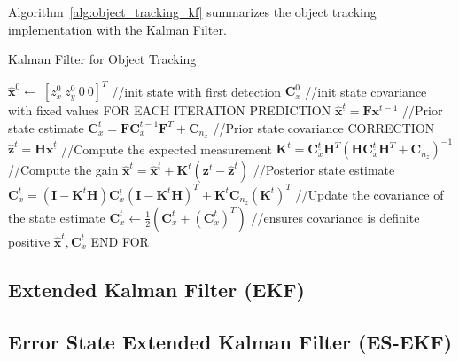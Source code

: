 Algorithm~\ref{alg:object_tracking_kf} summarizes the object tracking implementation with the Kalman Filter.
\begin{algorithm}
\caption{Kalman Filter for Object Tracking}
\begin{algorithmic}
\STATE $\hat{\mathbf{x}}^0 \leftarrow\ [z^0_x\ z^0_y\ 0\ 0]^T$ //init state with first detection
\STATE$\mathbf{C}^0_x$ //init state covariance with fixed values 
\STATE FOR EACH ITERATION
\STATE \hspace{0.5cm} PREDICTION
\STATE \hspace{1cm} $\hat{\mathbf{x}}^{\underline{t}} = \mathbf{F}\mathbf{x}^{t-1}$ //Prior state estimate
\STATE \hspace{1cm} $\mathbf{C}^{\underline{t}}_x = \mathbf{F}\mathbf{C}^{t-1}_x\mathbf{F}^T + \mathbf{C}_{n_x}$ //Prior state covariance
\STATE \hspace{0.5cm} CORRECTION
\STATE \hspace{1cm} $\hat{\mathbf{z}}^t = \mathbf{H}\hat{\mathbf{x}}^{\underline{t}}$ //Compute the expected measurement 
\STATE \hspace{1cm} $\mathbf{K}^t = \mathbf{C}^{\underline{t}}_x\mathbf{H}^T(\mathbf{H}\mathbf{C}^{\underline{t}}_x\mathbf{H}^T+\mathbf{C}_{n_z})^{-1}$ 
//Compute the gain
\STATE \hspace{1cm} $\hat{\mathbf{x}}^t = \hat{\mathbf{x}}^{\underline{t}} + \mathbf{K}^t(\mathbf{z}^t - \hat{\mathbf{z}}^t)$ //Posterior state estimate
\STATE \hspace{1cm} $\mathbf{C}^t_{x} = (\mathbf{I}-\mathbf{K}^t\mathbf{H})\mathbf{C}^{\underline{t}}_x(\mathbf{I}-\mathbf{K}^t\mathbf{H})^T
		    + \mathbf{K}^t\mathbf{C}_{n_z}(\mathbf{K}^t)^T$ //Update the covariance of the state estimate
\STATE \hspace{1cm} $\mathbf{C}^t_{x} \leftarrow \frac{1}{2}(\mathbf{C}^t_{x}+(\mathbf{C}^t_{x})^T)$ //ensures covariance is definite positive
\RETURN $\hat{\mathbf{x}}^t,\mathbf{C}^t_x$		    
\STATE END FOR
\end{algorithmic}
\label{alg:object_tracking_kf}
\end{algorithm}


\subsection{Extended Kalman Filter (EKF)}

\subsection{Error State Extended Kalman Filter (ES-EKF)}
